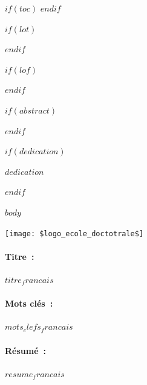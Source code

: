 \documentclass[12pt,a4paper]{reedthesis}
\begin{document}
$if(toc)$
  \hypersetup{linkcolor=$if(toccolor)$$toccolor$$else$black$endif$}
  \setcounter{secnumdepth}{$toc-depth$}
  \setcounter{tocdepth}{$toc-depth$}
  \tableofcontents
$endif$

$if(lot)$
  \listoftables
$endif$

$if(lof)$
  \listoffigures
$endif$

$if(abstract)$
  \begin{abstract}
    $abstract$
  \end{abstract}
$endif$

$if(dedication)$
  \begin{dedication}
    $dedication$
  \end{dedication}
$endif$

\mainmatter %
\pagestyle{fancyplain} %

$body$


\ifthispageodd{}{\newpage\thispagestyle{empty}\null}
\newpage
\thispagestyle{empty}
\selectfont

\lhead{}
\rhead{}
\rfoot{}
\cfoot{}
\lfoot{}

\noindent
\texttt{[image: \$logo\_ecole\_doctotrale\$]}
\vspace{1cm}

\begin{mdframed}[linecolor=Prune,linewidth=1]
\vspace{-.25cm}
\paragraph*{Titre~:} $titre_francais$
\begin{small}
\vspace{-.25cm}
\paragraph*{Mots clés~:} $mots_clefs_francais$

\vspace{-.5cm}
\begin{multicols}{2}
\paragraph*{Résumé~:} $resume_francais$
\end{multicols}
\end{small}
\end{mdframed}
\end{document}
